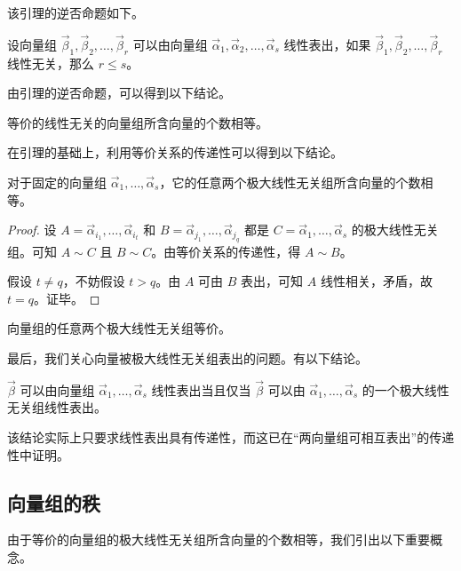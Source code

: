该引理的逆否命题如下。

\begin{theorem}
	设向量组 $\vec \beta_1, \vec \beta_2, \ldots, \vec \beta_r$ 可以由向量组 $\vec \alpha_1, \vec \alpha_2, \ldots, \vec \alpha_s$ 线性表出，如果 $\vec \beta_1, \vec \beta_2, \ldots, \vec \beta_r$ 线性无关，那么 $r \le s$。
\end{theorem}

由引理的逆否命题，可以得到以下结论。

\begin{theorem}
	等价的线性无关的向量组所含向量的个数相等。
\end{theorem}

在引理的基础上，利用等价关系的传递性可以得到以下结论。

\begin{theorem}
	对于固定的向量组 $\vec \alpha_1, \ldots, \vec \alpha_s$，它的任意两个极大线性无关组所含向量的个数相等。
\end{theorem}

\begin{proof}
	设 $A = \vec \alpha_{i_1}, \ldots, \vec \alpha_{i_t}$ 和 $B = \vec \alpha_{j_1}, \ldots, \vec \alpha_{j_q}$ 都是 $C = \vec \alpha_1, \ldots, \vec \alpha_s$ 的极大线性无关组。可知 $A \sim C$ 且 $B \sim C$。由等价关系的传递性，得 $A \sim B$。

	假设 $t \ne q$，不妨假设 $t > q$。由 $A$ 可由 $B$ 表出，可知 $A$ 线性相关，矛盾，故 $t = q$。证毕。
\end{proof}

\begin{theorem}
	向量组的任意两个极大线性无关组等价。
\end{theorem}

最后，我们关心向量被极大线性无关组表出的问题。有以下结论。

\begin{theorem}
	$\vec \beta$ 可以由向量组 $\vec \alpha_1, \ldots, \vec \alpha_s$ 线性表出当且仅当 $\vec \beta$ 可以由 $\vec \alpha_1, \ldots, \vec \alpha_s$ 的一个极大线性无关组线性表出。
\end{theorem}

该结论实际上只要求线性表出具有传递性，而这已在“两向量组可相互表出”的传递性中证明。

\subsection{向量组的秩}

由于等价的向量组的极大线性无关组所含向量的个数相等，我们引出以下重要概念。

